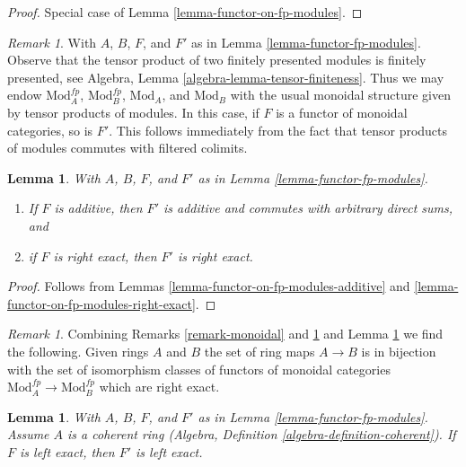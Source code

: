 \documentclass{stacks-project}
\theoremstyle{plain}
\newtheorem{lemma}[subsection]{Lemma}
\theoremstyle{definition}
\theoremstyle{remark}
\newtheorem{remark}[subsection]{Remark}
\numberwithin{equation}{subsection}
\begin{document}
\begin{proof}
Special case of Lemma \ref{lemma-functor-on-fp-modules}.
\end{proof}

\begin{remark}
\label{remark-monoidal-extension}
With $A$, $B$, $F$, and $F'$ as in Lemma \ref{lemma-functor-fp-modules}.
Observe that the tensor product of two finitely presented modules is
finitely presented, see Algebra, Lemma \ref{algebra-lemma-tensor-finiteness}.
Thus we may endow $\text{Mod}^{fp}_A$, $\text{Mod}^{fp}_B$,
$\text{Mod}_A$, and $\text{Mod}_B$ with the usual monoidal structure
given by tensor products of modules. In this case, if $F$ is
a functor of monoidal categories, so is $F'$. This follows immediately
from the fact that tensor products of modules commutes with filtered
colimits.
\end{remark}

\begin{lemma}
\label{lemma-functor-fp-modules-exact}
With $A$, $B$, $F$, and $F'$ as in Lemma \ref{lemma-functor-fp-modules}.
\begin{enumerate}
\item If $F$ is additive, then $F'$ is additive and
commutes with arbitrary direct sums, and
\item if $F$ is right exact, then $F'$ is right exact.
\end{enumerate}
\end{lemma}

\begin{proof}
Follows from Lemmas \ref{lemma-functor-on-fp-modules-additive} and
\ref{lemma-functor-on-fp-modules-right-exact}.
\end{proof}

\begin{remark}
\label{remark-monoidal-extension-exact}
Combining Remarks \ref{remark-monoidal} and \ref{remark-monoidal-extension}
and Lemma \ref{lemma-functor-fp-modules-exact}
we find the following. Given rings $A$ and $B$ the set of ring maps $A \to B$
is in bijection with the set of isomorphism classes
of functors of monoidal categories $\text{Mod}^{fp}_A \to \text{Mod}^{fp}_B$
which are right exact.
\end{remark}

\begin{lemma}
\label{lemma-functor-fp-modules-left-exact}
With $A$, $B$, $F$, and $F'$ as in Lemma \ref{lemma-functor-fp-modules}.
Assume $A$ is a coherent ring
(Algebra, Definition \ref{algebra-definition-coherent}).
If $F$ is left exact, then $F'$ is left exact.
\end{lemma}
\end{document}
